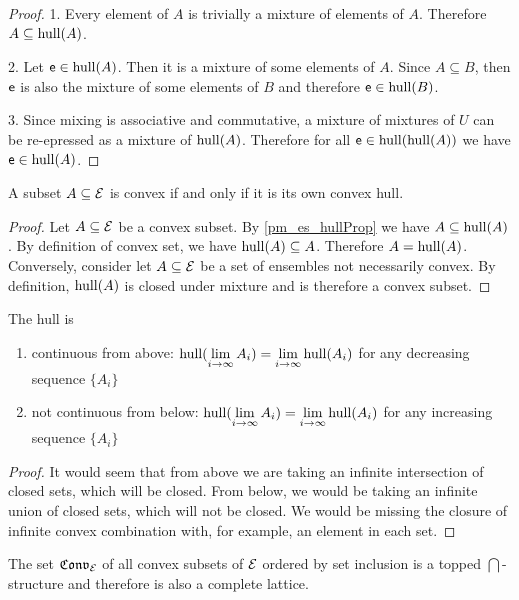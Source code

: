 \begin{proof}
	1. Every element of $A$ is trivially a mixture of elements of $A$. Therefore $A \subseteq \mathrm{hull}(A)$.
	
	2. Let $\mathsf{e} \in \mathrm{hull}(A)$. Then it is a mixture of some elements of $A$. Since $A \subseteq B$, then $\mathsf{e}$ is also the mixture of some elements of $B$ and therefore $\mathsf{e} \in \mathrm{hull}(B)$.
	
	3. Since mixing is associative and commutative, a mixture of mixtures of $U$ can be re-epressed as a mixture of $\mathrm{hull}(A)$. Therefore for all $\mathsf{e} \in \mathrm{hull}(\mathrm{hull}(A))$ we have $\mathsf{e} \in \mathrm{hull}(A)$.
\end{proof}

\begin{coro}
	A subset $A \subseteq \mathcal{E}$ is convex if and only if it is its own convex hull.
\end{coro}

\begin{proof}
	Let $A \subseteq \mathcal{E}$ be a convex subset. By \ref{pm_es_hullProp} we have $A \subseteq \mathrm{hull}(A)$. By definition of convex set, we have $\mathrm{hull}(A) \subseteq A$. Therefore $A = \mathrm{hull}(A)$. Conversely, consider let $A \subseteq \mathcal{E}$ be a set of ensembles not necessarily convex. By definition, $\mathrm{hull}(A)$ is closed under mixture and is therefore a convex subset.
\end{proof}

\begin{conj}
	The hull is
	\begin{enumerate}
		\item continuous from above: $\mathrm{hull}(\lim\limits_{i \to \infty} A_i) = \lim\limits_{i \to \infty} \mathrm{hull}(A_i)$ for any decreasing sequence $\{A_i\}$
		\item not continuous from below: $\mathrm{hull}(\lim\limits_{i \to \infty} A_i) = \lim\limits_{i \to \infty} \mathrm{hull}(A_i)$ for any increasing sequence $\{A_i\}$
	\end{enumerate}
\end{conj}

\begin{proof}
	It would seem that from above we are taking an infinite intersection of closed sets, which will be closed. From below, we would be taking an infinite union of closed sets, which will not be closed. We would be missing the closure of infinite convex combination with, for example, an element in each set.
\end{proof}

\begin{coro}
	The set $\mathfrak{Conv}_{\mathcal{E}}$ of all convex subsets of $\mathcal{E}$ ordered by set inclusion is a topped $\bigcap$-structure and therefore is also a complete lattice.
\end{coro}

